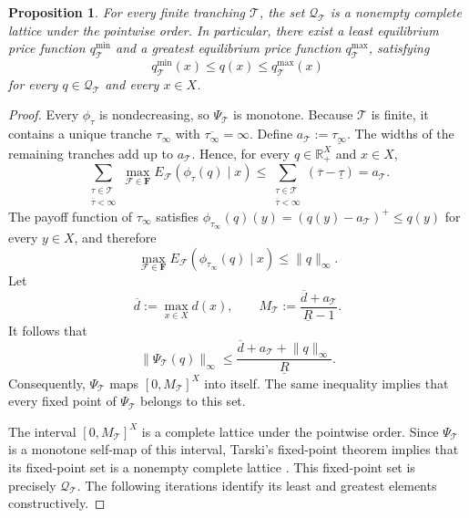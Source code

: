 \documentclass[11pt]{article}
\theoremstyle{plain}
\newtheorem{prp}{Proposition}%
\begin{document}
\begin{prp} \label{exu}
For every finite tranching $\mathcal{T}$, the set $\mathcal{Q}_{\mathcal{T}}$ is a nonempty complete lattice under the pointwise order. In particular, there exist a least equilibrium price function $q^{\min}_{\mathcal{T}}$ and a greatest equilibrium price function $q^{\max}_{\mathcal{T}}$, satisfying
\[
q^{\min}_{\mathcal{T}}(x)
\leq q(x)
\leq q^{\max}_{\mathcal{T}}(x)
\]
for every $q\in\mathcal{Q}_{\mathcal{T}}$ and every $x\in X$.
\end{prp}

\begin{proof}
Every $\phi_\tau$ is nondecreasing, so $\Psi_{\mathcal{T}}$ is monotone. Because $\mathcal{T}$ is finite, it contains a unique tranche $\tau_\infty$ with $\overline{\tau_\infty}=\infty$. Define $a_{\mathcal{T}}:=\underline{\tau_\infty}$. The widths of the remaining tranches add up to $a_{\mathcal{T}}$. Hence, for every $q\in\mathbb{R}_+^X$ and $x\in X$,
\[
\sum_{\substack{\tau\in\mathcal{T}\\ \overline{\tau}<\infty}}
\max_{\mathcal{F}\in\mathbf{F}}
E_{\mathcal{F}}\left(\phi_\tau(q)\mid x\right)
\leq
\sum_{\substack{\tau\in\mathcal{T}\\ \overline{\tau}<\infty}}
\left(\overline{\tau}-\underline{\tau}\right)
=a_{\mathcal{T}}.
\]
The payoff function of $\tau_\infty$ satisfies $\phi_{\tau_\infty}(q)(y)=(q(y)-a_{\mathcal{T}})^+\leq q(y)$ for every $y\in X$, and therefore
\[
\max_{\mathcal{F}\in\mathbf{F}}
E_{\mathcal{F}}\left(\phi_{\tau_\infty}(q)\mid x\right)
\leq \lVert q\rVert_\infty.
\]
Let
\[
\overline d:=\max_{x\in X}d(x),
\qquad
M_{\mathcal{T}}:=\frac{\overline d+a_{\mathcal{T}}}{\underline R-1}.
\]
It follows that
\[
\lVert\Psi_{\mathcal{T}}(q)\rVert_\infty
\leq
\frac{\overline d+a_{\mathcal{T}}+\lVert q\rVert_\infty}{\underline R}.
\]
Consequently, $\Psi_{\mathcal{T}}$ maps $[0,M_{\mathcal{T}}]^X$ into itself. The same inequality implies that every fixed point of $\Psi_{\mathcal{T}}$ belongs to this set.

The interval $[0,M_{\mathcal{T}}]^X$ is a complete lattice under the pointwise order. Since $\Psi_{\mathcal{T}}$ is a monotone self-map of this interval, Tarski's fixed-point theorem implies that its fixed-point set is a nonempty complete lattice \citep{Tarski1955}. This fixed-point set is precisely $\mathcal{Q}_{\mathcal{T}}$. The following iterations identify its least and greatest elements constructively.


\end{proof}
\end{document}
